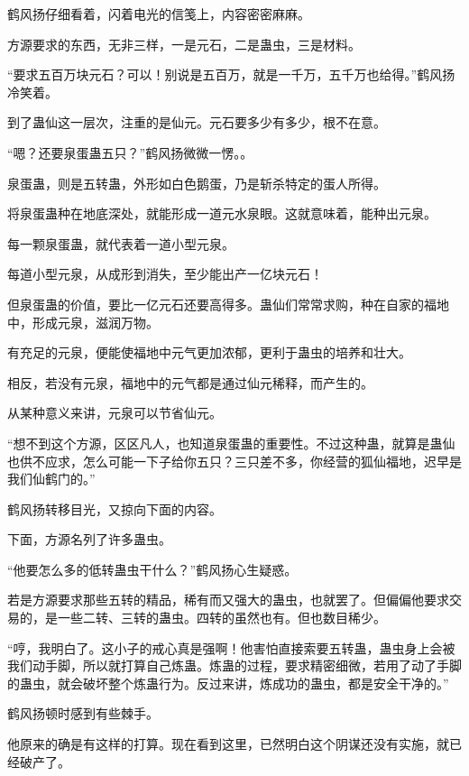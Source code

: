 
\begin{this_body}

鹤风扬仔细看着，闪着电光的信笺上，内容密密麻麻。

方源要求的东西，无非三样，一是元石，二是蛊虫，三是材料。

“要求五百万块元石？可以！别说是五百万，就是一千万，五千万也给得。”鹤风扬冷笑着。

到了蛊仙这一层次，注重的是仙元。元石要多少有多少，根不在意。

“嗯？还要泉蛋蛊五只？”鹤风扬微微一愣。。

泉蛋蛊，则是五转蛊，外形如白色鹅蛋，乃是斩杀特定的蛋人所得。

将泉蛋蛊种在地底深处，就能形成一道元水泉眼。这就意味着，能种出元泉。

每一颗泉蛋蛊，就代表着一道小型元泉。

每道小型元泉，从成形到消失，至少能出产一亿块元石！

但泉蛋蛊的价值，要比一亿元石还要高得多。蛊仙们常常求购，种在自家的福地中，形成元泉，滋润万物。

有充足的元泉，便能使福地中元气更加浓郁，更利于蛊虫的培养和壮大。

相反，若没有元泉，福地中的元气都是通过仙元稀释，而产生的。

从某种意义来讲，元泉可以节省仙元。

“想不到这个方源，区区凡人，也知道泉蛋蛊的重要性。不过这种蛊，就算是蛊仙也供不应求，怎么可能一下子给你五只？三只差不多，你经营的狐仙福地，迟早是我们仙鹤门的。”

鹤风扬转移目光，又掠向下面的内容。

下面，方源名列了许多蛊虫。

“他要怎么多的低转蛊虫干什么？”鹤风扬心生疑惑。

若是方源要求那些五转的精品，稀有而又强大的蛊虫，也就罢了。但偏偏他要求交易的，是一些二转、三转的蛊虫。四转的虽然也有。但也数目稀少。

“哼，我明白了。这小子的戒心真是强啊！他害怕直接索要五转蛊，蛊虫身上会被我们动手脚，所以就打算自己炼蛊。炼蛊的过程，要求精密细微，若用了动了手脚的蛊虫，就会破坏整个炼蛊行为。反过来讲，炼成功的蛊虫，都是安全干净的。”

鹤风扬顿时感到有些棘手。

他原来的确是有这样的打算。现在看到这里，已然明白这个阴谋还没有实施，就已经破产了。


\end{this_body}
